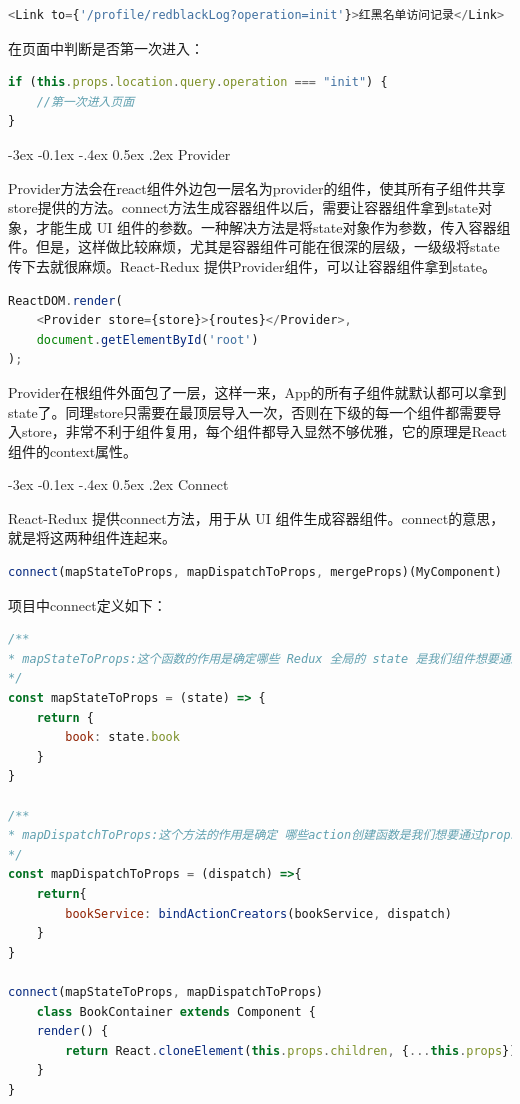 \documentclass[12pt]{book}
\makeatletter
\numberwithin{dummy}{section}
\theoremstyle{ocrenumbox}
\theoremstyle{blacknumex}
\theoremstyle{blacknumbox}
\theoremstyle{ocrenum}
\renewcommand{\subsection}{\@startsection {subsection}{2}{\z@}
	{-3ex \@plus -0.1ex \@minus -.4ex}
	{0.5ex \@plus.2ex }
	{\normalfont\sffamily\bfseries}}
\makeatother
\begin{document}
\begin{lstlisting}[language=Javascript]
<Link to={'/profile/redblackLog?operation=init'}>红黑名单访问记录</Link>
\end{lstlisting}

在页面中判断是否第一次进入：

\begin{lstlisting}[language=Javascript]
if (this.props.location.query.operation === "init") {
	//第一次进入页面
}
\end{lstlisting}

\subsection{Provider}

Provider方法会在react组件外边包一层名为provider的组件，使其所有子组件共享store提供的方法。connect方法生成容器组件以后，需要让容器组件拿到state对象，才能生成 UI 组件的参数。一种解决方法是将state对象作为参数，传入容器组件。但是，这样做比较麻烦，尤其是容器组件可能在很深的层级，一级级将state传下去就很麻烦。React-Redux 提供Provider组件，可以让容器组件拿到state。

\begin{lstlisting}[language=Javascript]
ReactDOM.render(
	<Provider store={store}>{routes}</Provider>,
	document.getElementById('root')
);
\end{lstlisting}

Provider在根组件外面包了一层，这样一来，App的所有子组件就默认都可以拿到state了。同理store只需要在最顶层导入一次，否则在下级的每一个组件都需要导入store，非常不利于组件复用，每个组件都导入显然不够优雅，它的原理是React组件的context属性。

\subsection{Connect}

React-Redux 提供connect方法，用于从 UI 组件生成容器组件。connect的意思，就是将这两种组件连起来。

\begin{lstlisting}[language=Javascript]
connect(mapStateToProps, mapDispatchToProps, mergeProps)(MyComponent)
\end{lstlisting}

项目中connect定义如下：

\begin{lstlisting}[language=Javascript]
/**
* mapStateToProps:这个函数的作用是确定哪些 Redux 全局的 state 是我们组件想要通过 props 获取
*/
const mapStateToProps = (state) => {
	return {
		book: state.book
	}
}

/**
* mapDispatchToProps:这个方法的作用是确定 哪些action创建函数是我们想要通过props获取
*/
const mapDispatchToProps = (dispatch) =>{
	return{
		bookService: bindActionCreators(bookService, dispatch)
	}
}

connect(mapStateToProps, mapDispatchToProps)
	class BookContainer extends Component {
	render() {
		return React.cloneElement(this.props.children, {...this.props});
	}
}
\end{lstlisting}
\end{document}

